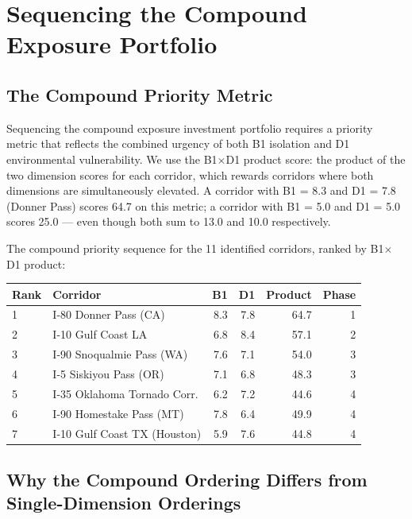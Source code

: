 \section{Sequencing the Compound Exposure Portfolio}
\label{sec:investment-sequencing}

\subsection{The Compound Priority Metric}

Sequencing the compound exposure investment portfolio requires a priority metric that reflects the combined urgency of both B1 isolation and D1 environmental vulnerability. We use the B1$\times$D1 product score: the product of the two dimension scores for each corridor, which rewards corridors where both dimensions are simultaneously elevated. A corridor with B1 = 8.3 and D1 = 7.8 (Donner Pass) scores 64.7 on this metric; a corridor with B1 = 5.0 and D1 = 5.0 scores 25.0 --- even though both sum to 13.0 and 10.0 respectively.

The compound priority sequence for the 11 identified corridors, ranked by B1$\times$D1 product:

\begin{center}
\begin{tabular}{llrrrr}
\toprule
\textbf{Rank} & \textbf{Corridor} & \textbf{B1} & \textbf{D1} & \textbf{Product} & \textbf{Phase} \\
\midrule
1 & I-80 Donner Pass (CA)       & 8.3 & 7.8 & 64.7 & 1 \\
2 & I-10 Gulf Coast LA          & 6.8 & 8.4 & 57.1 & 2 \\
3 & I-90 Snoqualmie Pass (WA)   & 7.6 & 7.1 & 54.0 & 3 \\
4 & I-5 Siskiyou Pass (OR)      & 7.1 & 6.8 & 48.3 & 3 \\
5 & I-35 Oklahoma Tornado Corr. & 6.2 & 7.2 & 44.6 & 4 \\
6 & I-90 Homestake Pass (MT)    & 7.8 & 6.4 & 49.9 & 4 \\
7 & I-10 Gulf Coast TX (Houston)& 5.9 & 7.6 & 44.8 & 4 \\
\bottomrule
\end{tabular}
\end{center}

\subsection{Why the Compound Ordering Differs from Single-Dimension Orderings}

